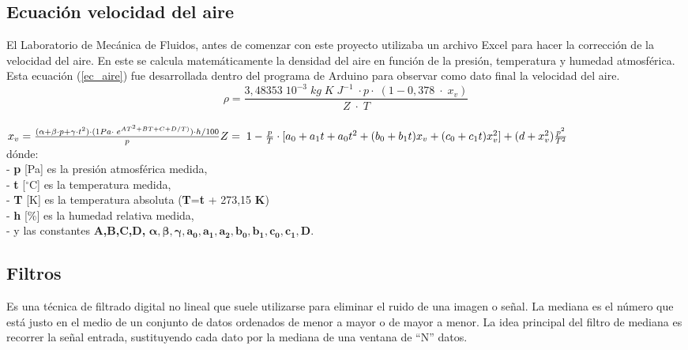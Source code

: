 \subsection{Ecuación velocidad del aire}
El Laboratorio de Mecánica de Fluidos, antes de comenzar con este proyecto utilizaba un archivo Excel para hacer la corrección de la velocidad del aire. En este se calcula matemáticamente la densidad del aire en función de la presión, temperatura y humedad atmosférica. Esta ecuación (\ref{ec_aire}) fue desarrollada dentro del programa de Arduino para observar como dato final la velocidad del aire.\\
\begin{equation}
\rho=\frac{3,48353\;10^{-3}\;kg\;K\;J^{-1}\;\cdot p\cdot\;(1-0,378\;\cdot\;x_v)}{Z\;\cdot\;T} \label{ec_aire}
\end{equation}	
\\
\begin{math}
	x_v=\frac{(\alpha+\beta\cdot p+\gamma\cdot t^2)\cdot(1Pa\cdot\;e^{AT^2+BT+C+D/T)})\cdot h/100}p\\\\
	Z=\;1-\frac pT\cdot\lbrack a_0+a_1t+a_0t^2+(b_0+b_1t)x_v+(c_0+c_1t)x_v^2\rbrack+(d+x_v^2)\frac{p^2}{T^2}
\end{math}
\\
dónde:\\
- \textbf{p } [Pa] es la presión atmosférica medida,\\
- \textbf{t } [$^{\circ}$C] es la temperatura medida,\\
- \textbf{T } [K] es la temperatura absoluta (\textbf{T}=\textbf{t} + 273,15 \textbf{K})\\
- \textbf{h } [\%] es la humedad relativa medida,\\
- y las constantes \textbf{A,B,C,D,} $\boldsymbol{\alpha , \beta  , \gamma , a_0, a_1 ,a_2 ,b_0  ,b_1 , c_0 , c_1, D. }$






\subsection{Filtros}
\begin{tcolorbox}[colback=blue!5!white,colframe=blue!75!black,title=Mediana]
	Es una técnica de filtrado digital no lineal que suele utilizarse para eliminar el ruido de una imagen o señal. La mediana es el número que está justo en el medio de un conjunto de datos ordenados de menor a mayor o de mayor a menor. 
	La idea principal del filtro de mediana es recorrer la señal entrada, sustituyendo cada dato por la mediana de una ventana de “N” datos. 
	
\end{tcolorbox}


